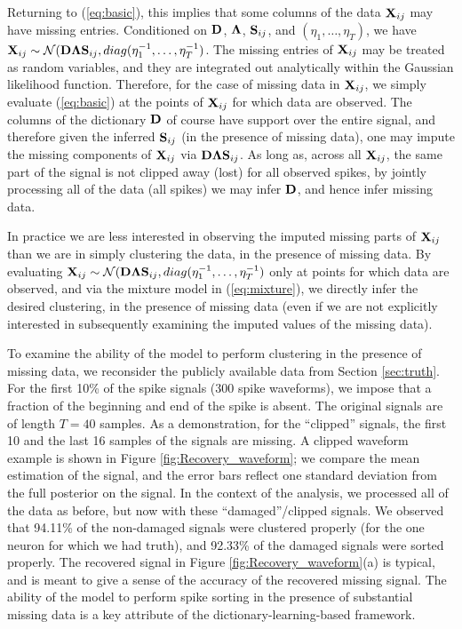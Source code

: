 \documentclass[journal]{IEEEtran}
\begin{document}
Returning to (\ref{eq:basic}), this implies that some columns of the data ${\mathbf X}_{ij}$ may have missing entries. Conditioned on ${\mathbf D}$, $\boldsymbol{\Lambda}$, ${\mathbf S}_{ij}$, and $(\eta_1,\dots,\eta_T)$, we have ${\mathbf X}_{ij}\sim\mathcal{N}({\mathbf D}\boldsymbol{\Lambda}{\mathbf S}_{ij},\relax{diag}(\eta_1^{-1},\dots,\eta_T^{-1})$. The missing entries of ${\mathbf X}_{ij}$ may be treated as random variables, and they are integrated out analytically within the Gaussian likelihood function. Therefore, for the case of missing data in ${\mathbf X}_{ij}$, we simply evaluate (\ref{eq:basic}) at the points of ${\mathbf X}_{ij}$ for which data are observed. The columns of the dictionary ${\mathbf D}$ of course have support over the entire signal, and therefore given the inferred ${\mathbf S}_{ij}$ (in the presence of missing data), one may impute the missing components of ${\mathbf X}_{ij}$ via ${\mathbf D}\boldsymbol{\Lambda}{\mathbf S}_{ij}$. As long as, across all ${\mathbf X}_{ij}$, the same part of the signal is not clipped away (lost) for all observed spikes, by jointly processing all of the data (all spikes) we may infer ${\mathbf D}$, and hence infer missing data.

In practice we are less interested in observing the imputed missing parts of ${\mathbf X}_{ij}$ than we are in simply clustering the data, in the presence of missing data. By evaluating ${\mathbf X}_{ij}\sim\mathcal{N}({\mathbf D}\boldsymbol{\Lambda}{\mathbf S}_{ij},\relax{diag}(\eta_1^{-1},\dots,\eta_T^{-1})$ only at points for which data are observed, and via the mixture model in (\ref{eq:mixture}), we directly infer the desired clustering, in the presence of missing data (even if we are not explicitly interested in subsequently examining the imputed values of the missing data).

To examine the ability of the model to perform clustering in the
presence of missing data, we reconsider the publicly available data
from Section \ref{sec:truth}. For the first 10\% of the spike
signals (300 spike waveforms), we impose that a fraction of
the beginning and end of the spike is absent. The original signals
are of length $T=40$ samples. As a demonstration, for the ``clipped'' signals, the first 10 and the last 16 samples of the
signals are missing. A clipped waveform example is shown in Figure \ref{fig:Recovery_waveform}; we compare the mean estimation of the signal, and the error bars reflect one standard deviation from the full posterior on the signal.
In the context of the analysis, we processed all of the data as before, but now with these ``damaged''/clipped signals. We observed that 94.11\% of the non-damaged signals were clustered properly (for the one neuron for which we had truth), and 92.33\% of the damaged signals were sorted properly. The recovered signal in Figure \ref{fig:Recovery_waveform}(a) is typical, and is meant to give a sense of the accuracy of the recovered missing signal. The ability of the model to perform spike sorting in the presence of substantial missing data is a key attribute of the dictionary-learning-based framework.
\end{document}
